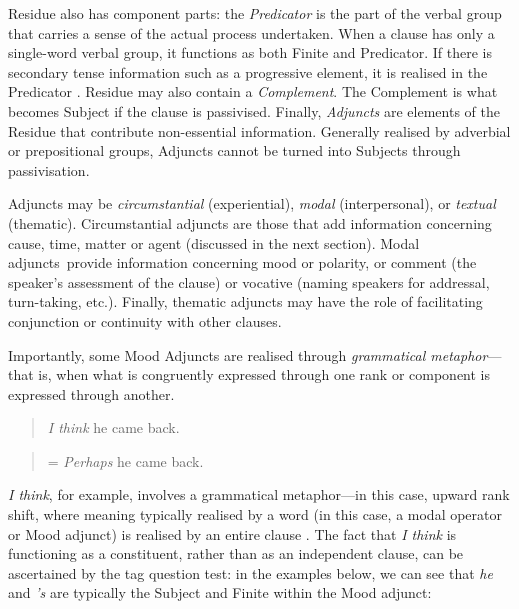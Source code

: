 Residue also has component parts: the \emph{Predicator} is the part of the verbal group that carries a sense of the actual process undertaken. When a clause has only a single-word verbal group, it functions as both Finite and Predicator. If there is secondary tense information such as a progressive element, it is realised in the Predicator \cite{halliday_introduction_2004}. Residue may also contain a \emph{Complement}. The Complement is what becomes Subject if the clause is passivised. Finally, \emph{Adjuncts} are elements of the Residue that contribute non-essential information. Generally realised by adverbial or prepositional groups, Adjuncts cannot be turned into Subjects through passivisation.

Adjuncts may be \emph{circumstantial} (experiential), \emph{modal} (interpersonal), or \emph{textual} (thematic). Circumstantial adjuncts are those that add information concerning cause, time, matter or agent (discussed in the next section). Modal adjuncts~provide information concerning mood or polarity, or comment (the speaker's assessment of the clause) or vocative (naming speakers for addressal, turn\hyp{}taking, etc.). Finally, thematic adjuncts may have the role of facilitating conjunction or continuity with other clauses.

Importantly, some Mood Adjuncts are realised through \emph{grammatical metaphor}---that is, when what is congruently expressed through one rank or component is expressed through another.
%
\begin{multicols}{2}
\begin{quote}

\emph{I think} he came back.
\end{quote}

\begin{quote}

= \emph{Perhaps} he came back.
\end{quote}
\end{multicols}
%
\noindent \emph{I think}, for example, involves a grammatical metaphor---in this case, upward rank shift, where meaning typically realised by a word (in this case, a modal operator or Mood adjunct) is realised by an entire clause \cite{halliday_concept_1966,taverniers_systemic-functional_2002}. The fact that \emph{I think} is functioning as a constituent, rather than as an independent clause, can be ascertained by the tag question test: in the examples below, we can see that \emph{he} and \emph{'s} are typically the Subject and Finite within the Mood adjunct:

